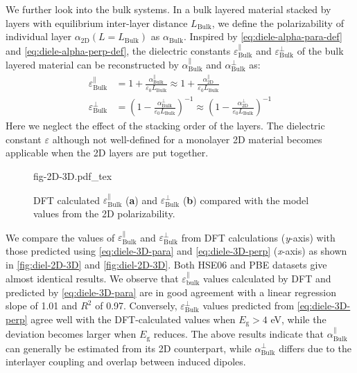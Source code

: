 We further look into the bulk systems. In a bulk layered material stacked by layers with equilibrium
inter-layer distance $L_{\mathrm{Bulk}}$, we define the polarizability
of individual layer $\alpha_{\mathrm{2D}}(L=L_{\mathrm{Bulk}})$ as
$\alpha_{\mathrm{Bulk}}$. Inspired by  \autoref{eq:diele-alpha-para-def} and
\autoref{eq:diele-alpha-perp-def}, the dielectric constants
$\varepsilon^{\parallel}_{\mathrm{Bulk}}$ and
$\varepsilon^{\perp}_{\mathrm{Bulk}}$ of the bulk layered material can
be reconstructed by $\alpha_{\mathrm{Bulk}}^{\parallel}$ and
$\alpha_{\mathrm{Bulk}}^{\perp}$  as:
%
%
\begin{subequations}
\begin{align}
  \label{eq:diele-3D-para}
  \varepsilon^{\parallel}_{\mathrm{Bulk}}
  &= 1 + \frac{\alpha_{\mathrm{Bulk}}^{\parallel}}{\varepsilon_{0} L_{\mathrm{Bulk}}}
  \approx 1 + \frac{\alpha_{\mathrm{2D}}^{\parallel}}{\varepsilon_{0} L_{\mathrm{Bulk}}} \\
  \label{eq:diele-3D-perp}
  \varepsilon^{\perp}_{\mathrm{Bulk}}
  &= \left(1 - \frac{\alpha_{\mathrm{Bulk}}^{\perp}}{\varepsilon_{0} L_{\mathrm{Bulk}}}\right)^{-1}
  \approx \left(1 - \frac{\alpha_{\mathrm{2D}}^{\perp}}{\varepsilon_{0} L_{\mathrm{Bulk}}}\right)^{-1}
\end{align}
\end{subequations}
%
%
Here we neglect the effect of the stacking order of the layers.  The
dielectric constant $\varepsilon$ although not well-defined for a
monolayer 2D material becomes applicable when the 2D layers are put
together.
\begin{figure}[!htbp]
\centering
{fig-2D-3D.pdf_tex}
\caption{\label{fig:diel-2D-3D} %
  DFT calculated $\varepsilon_{\mathrm{Bulk}}^{\parallel}$
  (\textbf{a}) and $\varepsilon_{\mathrm{Bulk}}^{\perp}$ (\textbf{b})
  compared with the model values from the 2D polarizability.  }
\end{figure}
%
We compare the values of
$\varepsilon_{\mathrm{Bulk}}^{\parallel}$ and
$\varepsilon_{\mathrm{Bulk}}^{\perp}$ from DFT calculations (\textit{y}-axis)
with those predicted using \autoref{eq:diele-3D-para} and \autoref{eq:diele-3D-perp}
(\textit{x}-axis) as shown in  \autoref{fig:diel-2D-3D} and \autoref{fig:diel-2D-3D}. 
Both HSE06 and PBE datasets give almost identical results.  
%
We observe that
$\varepsilon_{\mathrm{bulk}}^{\parallel}$ values calculated by DFT and
predicted by  \autoref{eq:diele-3D-para} are in good agreement with a linear
regression slope of 1.01 and $R^2$ of 0.97. Conversely,
$\varepsilon_{\mathrm{Bulk}}^{\perp}$ values predicted from
 \autoref{eq:diele-3D-perp} agree well with the DFT-calculated values when
$E_{\mathrm{g}}>4$ eV, while the deviation becomes larger when
$E_{\mathrm{g}}$ reduces. The above results indicate that
$\alpha^{\parallel}_{\mathrm{Bulk}}$ can generally be estimated from
its 2D counterpart, while $\alpha^{\perp}_{\mathrm{Bulk}}$ differs due
to the interlayer coupling and overlap between induced
dipoles\cite{Andersen_2015_dielec_vdWH,Laturia_2018_2D_eps}. 

